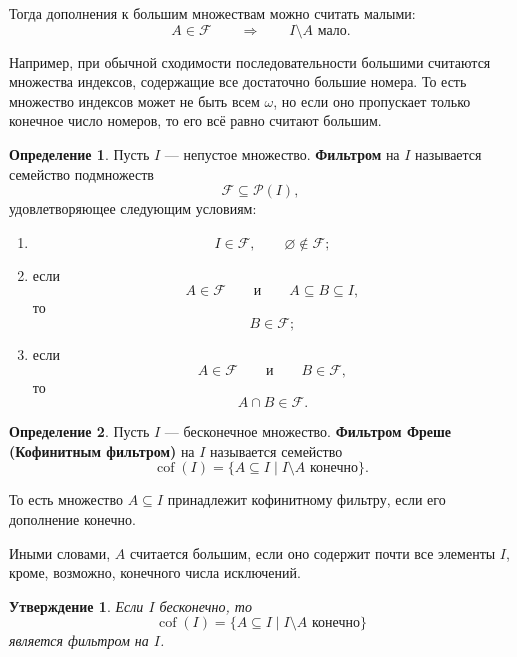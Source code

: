 \documentclass[12pt,a4paper,oneside,openany]{book}
\theoremstyle{definition}
\newtheorem{definition}{Определение}[chapter]
\theoremstyle{plain}
\newtheorem{proposition}{Утверждение}[chapter]
\theoremstyle{remark}
\begin{document}
Тогда дополнения к большим множествам можно считать малыми:
\[
A\in\mathcal F
\qquad
\Longrightarrow
\qquad
I\setminus A \text{ мало}.
\]

Например, при обычной сходимости последовательности большими считаются множества индексов, содержащие все достаточно большие номера. То есть множество индексов может не быть всем $\omega$, но если оно пропускает только конечное число номеров, то его всё равно считают большим.


\begin{definition}
Пусть $I$ — непустое множество. \textbf{Фильтром} на $I$ называется семейство подмножеств
\[
\mathcal F\subseteq \mathcal P(I),
\]
удовлетворяющее следующим условиям:
\begin{enumerate}
    \item
    \[
    I\in\mathcal F,
    \qquad
    \varnothing\notin\mathcal F;
    \]

    \item если
    \[
    A\in\mathcal F
    \qquad
    \text{и}
    \qquad
    A\subseteq B\subseteq I,
    \]
    то
    \[
    B\in\mathcal F;
    \]

    \item если
    \[
    A\in\mathcal F
    \qquad
    \text{и}
    \qquad
    B\in\mathcal F,
    \]
    то
    \[
    A\cap B\in\mathcal F.
    \]
\end{enumerate}
\end{definition}


\begin{definition}
Пусть $I$ — бесконечное множество. \textbf{Фильтром Фреше (Кофинитным фильтром)} на $I$ называется семейство
\[
\operatorname{cof}(I)
=
\{A\subseteq I\mid I\setminus A \text{ конечно}\}.
\]
\end{definition}

То есть множество $A\subseteq I$ принадлежит кофинитному фильтру, если его дополнение конечно.

Иными словами, $A$ считается большим, если оно содержит почти все элементы $I$, кроме, возможно, конечного числа исключений.

\begin{proposition}
Если $I$ бесконечно, то
\[
\operatorname{cof}(I)
=
\{A\subseteq I\mid I\setminus A \text{ конечно}\}
\]
является фильтром на $I$.
\end{proposition}
\end{document}
